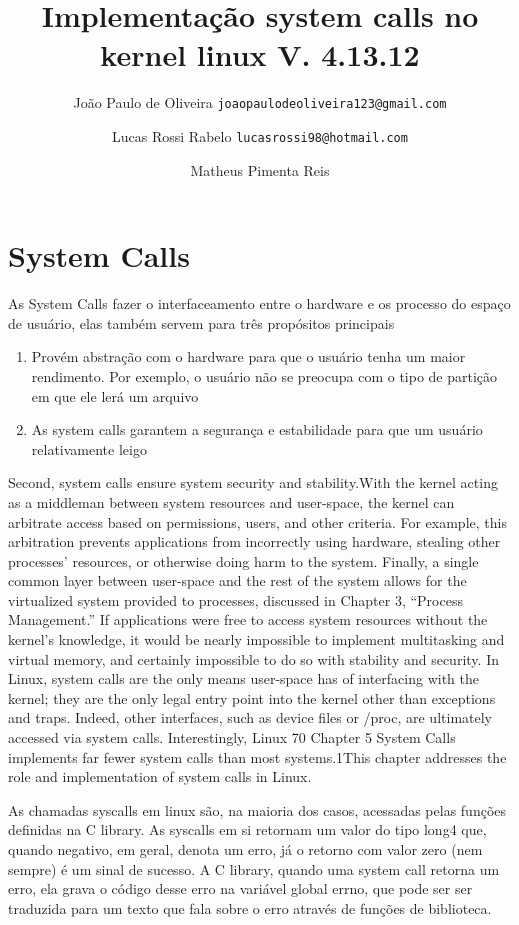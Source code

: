 \documentclass[12pt]{article}
\begin{document}
\title{Implementação system calls no kernel linux V. 4.13.12\vspace{3.5cm}} %

\author{
	João Paulo de Oliveira
	\texttt{joaopaulodeoliveira123@gmail.com}
	\and
	Lucas Rossi Rabelo
	\texttt{lucasrossi98@hotmail.com}
	\and		
	Matheus Pimenta Reis
	\texttt{}
	\vspace*{9cm}
}

\maketitle

\tableofcontents %

\pagebreak
\section*{System Calls}

As System Calls fazer o interfaceamento entre o hardware e os processo do espaço de usuário, elas também servem para três propósitos principais
\begin{enumerate}
	\item Provém abstração com o hardware para que o usuário tenha um maior rendimento. Por exemplo, o usuário não se preocupa com o tipo de partição em que ele lerá um arquivo
	\item As system calls garantem a segurança e estabilidade para que um usuário relativamente leigo 
\end{enumerate}
 Second, system calls ensure system security and stability.With the kernel acting as a middleman between system resources and user-space, the kernel can arbitrate access based on permissions, users, and other criteria. For example, this arbitration prevents applications from incorrectly using hardware, stealing other processes’ resources, or otherwise doing harm to the system. Finally, a single common layer between user-space and the rest of the system allows for the virtualized system provided to processes, discussed in Chapter 3,
“Process Management.” If applications were free to access system resources without the kernel’s knowledge, it would be nearly impossible to implement multitasking and virtual memory, and certainly impossible to do so with stability and security. In Linux, system calls are the only means user-space has of interfacing with the kernel; they are the only
legal entry point into the kernel other than exceptions and traps. Indeed, other interfaces, such as device files or /proc, are ultimately accessed via system calls. Interestingly, Linux
70 Chapter 5 System Calls implements far fewer system calls than most systems.1This chapter addresses the role and
implementation of system calls in Linux.


	As chamadas syscalls em linux são, na maioria dos casos, acessadas pelas funções definidas na C library. As syscalls em si retornam um valor do tipo long4 que, quando negativo, em geral, denota um erro, já o retorno com valor zero (nem sempre) é um sinal de sucesso. A C library, quando uma system call retorna um erro, ela grava o código desse erro na variável global errno, que pode ser ser traduzida para um texto que fala sobre o erro através de funções de biblioteca.
\end{document}
